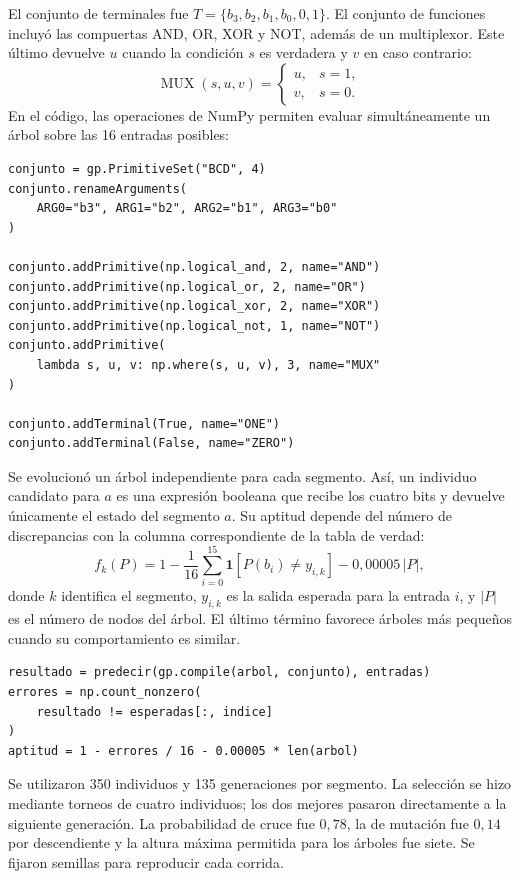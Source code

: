 \documentclass[14pt,twoside]{article}
\begin{document}
El conjunto de terminales fue \(T=\{b_3,b_2,b_1,b_0,0,1\}\). El conjunto de funciones incluyó las compuertas AND, OR, XOR y NOT, además de un multiplexor. Este último devuelve \(u\) cuando la condición \(s\) es verdadera y \(v\) en caso contrario:
\[
\operatorname{MUX}(s,u,v)=
\begin{cases}
u,&s=1,\\
v,&s=0.
\end{cases}
\]
En el código, las operaciones de NumPy permiten evaluar simultáneamente un árbol sobre las 16 entradas posibles:

\begin{lstlisting}[style=pgpython,caption={Funciones y terminales disponibles para los árboles booleanos.}]
conjunto = gp.PrimitiveSet("BCD", 4)
conjunto.renameArguments(
    ARG0="b3", ARG1="b2", ARG2="b1", ARG3="b0"
)

conjunto.addPrimitive(np.logical_and, 2, name="AND")
conjunto.addPrimitive(np.logical_or, 2, name="OR")
conjunto.addPrimitive(np.logical_xor, 2, name="XOR")
conjunto.addPrimitive(np.logical_not, 1, name="NOT")
conjunto.addPrimitive(
    lambda s, u, v: np.where(s, u, v), 3, name="MUX"
)

conjunto.addTerminal(True, name="ONE")
conjunto.addTerminal(False, name="ZERO")
\end{lstlisting}


Se evolucionó un árbol independiente para cada segmento. Así, un individuo candidato para \(a\) es una expresión booleana que recibe los cuatro bits y devuelve únicamente el estado del segmento \(a\). Su aptitud depende del número de discrepancias con la columna correspondiente de la tabla de verdad:
\[
f_k(P)=1-\frac{1}{16}\sum_{i=0}^{15}
\mathbf{1}\!\left[P(b_i)\ne y_{i,k}\right]
-0{,}00005\,|P|,
\]
donde \(k\) identifica el segmento, \(y_{i,k}\) es la salida esperada para la entrada \(i\), y \(|P|\) es el número de nodos del árbol. El último término favorece árboles más pequeños cuando su comportamiento es similar.

\begin{lstlisting}[style=pgpython,caption={Evaluación de la aptitud de un árbol para un segmento.}]
resultado = predecir(gp.compile(arbol, conjunto), entradas)
errores = np.count_nonzero(
    resultado != esperadas[:, indice]
)
aptitud = 1 - errores / 16 - 0.00005 * len(arbol)
\end{lstlisting}

Se utilizaron 350 individuos y 135 generaciones por segmento. La selección se hizo mediante torneos de cuatro individuos; los dos mejores pasaron directamente a la siguiente generación. La probabilidad de cruce fue \(0{,}78\), la de mutación fue \(0{,}14\) por descendiente y la altura máxima permitida para los árboles fue siete. Se fijaron semillas para reproducir cada corrida.
\end{document}
